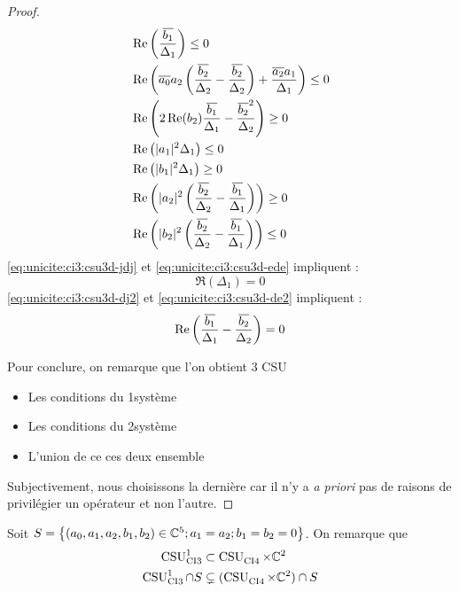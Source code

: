 \begin{proof}
\begin{minipage}{0.49\textwidth}
\begin{align}
        \label{eq:unicite:ci3:csu3d-e2}&\Re\left(\frac{\conj{b_1}}{\Delta_1}\right) \le 0 \\
        \label{eq:unicite:ci3:csu3d-jrj}&\Re\left(\conj{a_0}a_2\left(\frac{\conj{b_2}}{\Delta_2}-\frac{\conj{b_2}}{\Delta_2}\right) + \frac{\conj{a_2}a_1}{\Delta_1} \right)\le 0\\
        \label{eq:unicite:ci3:csu3d-ere}&\Re\left(2\Re(b_2)\frac{\conj{b_1}}{\Delta_1}-\frac{\conj{b_2}^2}{\Delta_2}\right) \ge 0\\
        \label{eq:unicite:ci3:csu3d-jdj}&\Re\left(|a_1|^2\Delta_1\right) \le 0 \\
        \label{eq:unicite:ci3:csu3d-ede}&\Re\left(|b_1|^2\Delta_1\right) \ge 0 \\
        \label{eq:unicite:ci3:csu3d-dj2}&\Re\left(|a_2|^2\left(\frac{\conj{b_2}}{\Delta_2}-\frac{\conj{b_1}}{\Delta_1}\right)\right)\ge 0\\
        \label{eq:unicite:ci3:csu3d-de2}&\Re\left(|b_2|^2\left(\frac{\conj{b_2}}{\Delta_2}-\frac{\conj{b_1}}{\Delta_1}\right)\right)\le 0
      \end{align}
      \eqref{eq:unicite:ci3:csu3d-jdj} et \eqref{eq:unicite:ci3:csu3d-ede} impliquent :
      \begin{equation}
        \Re\left(\Delta_1\right) = 0
      \end{equation}
      \eqref{eq:unicite:ci3:csu3d-dj2} et \eqref{eq:unicite:ci3:csu3d-de2} impliquent :
      \begin{equation}
        \Re\left(\frac{\conj{b_1}}{\Delta_1}-\frac{\conj{b_2}}{\Delta_2}\right) = 0
      \end{equation}
    \end{minipage}

    Pour conclure, on remarque que l'on obtient 3 CSU
    \begin{itemize}
      \item Les conditions du 1\ier système
      \item Les conditions du 2\ieme système
      \item L'union de ce ces deux ensemble
    \end{itemize}

    Subjectivement, nous choisissons la dernière car il n'y a \textit{a priori} pas de raisons de privilégier un opérateur et non l'autre.
  \end{proof}

  Soit \(S = \left\lbrace (a_0,a_1,a_2,b_1,b_2) \in \CC^5 ; a_1 = a_2 ; b_1 = b_2 = 0 \right\rbrace \). On remarque que
  \begin{align}
    \CSU[1]{CI3} & \subset \CSU{CI4}\times\CC^2
    \\
    \CSU[1]{CI3}\cap S & \subsetneq (\CSU{CI4}\times\CC^2)\cap S 
  \end{align}

